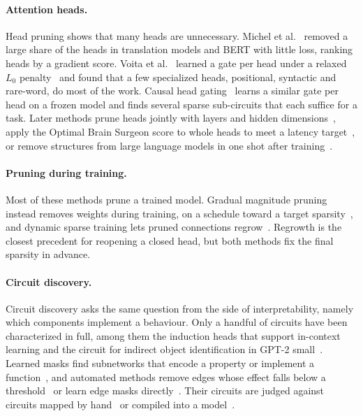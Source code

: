 \paragraph{Attention heads.}
Head pruning shows that many heads are unnecessary. Michel et al.~\citep{michel2019sixteen} removed a large share of the heads in translation models and BERT with little loss, ranking heads by a gradient score. Voita et al.~\citep{voita2019analyzing} learned a gate per head under a relaxed $L_0$ penalty~\citep{louizos2018learning} and found that a few specialized heads, positional, syntactic and rare-word, do most of the work. Causal head gating~\citep{nam2025causal} learns a similar gate per head on a frozen model and finds several sparse sub-circuits that each suffice for a task. Later methods prune heads jointly with layers and hidden dimensions~\citep{xia2022structured,hou2020dynabert}, apply the Optimal Brain Surgeon score to whole heads to meet a latency target~\citep{ziplm}, or remove structures from large language models in one shot after training~\citep{frantar2023sparsegpt,ma2023llmpruner,ashkboos2024slicegpt}.

\paragraph{Pruning during training.}
Most of these methods prune a trained model. Gradual magnitude pruning instead removes weights during training, on a schedule toward a target sparsity~\citep{zhu2017prune}, and dynamic sparse training lets pruned connections regrow~\citep{evci2020rigging}. Regrowth is the closest precedent for reopening a closed head, but both methods fix the final sparsity in advance.

\paragraph{Circuit discovery.}
Circuit discovery asks the same question from the side of interpretability, namely which components implement a behaviour. Only a handful of circuits have been characterized in full, among them the induction heads that support in-context learning and the circuit for indirect object identification in GPT-2 small~\cite{olsson2022,wang2023interpretability}. Learned masks find subnetworks that encode a property or implement a function~\citep{cao2021low,csordas2021neural}, and automated methods remove edges whose effect falls below a threshold~\citep{conmy2023towards,syed2023attribution} or learn edge masks directly~\citep{bhaskar2024finding}. Their circuits are judged against circuits mapped by hand~\citep{wang2023interpretability} or compiled into a model~\citep{lindner2023tracr,gupta2024interpbench}.

